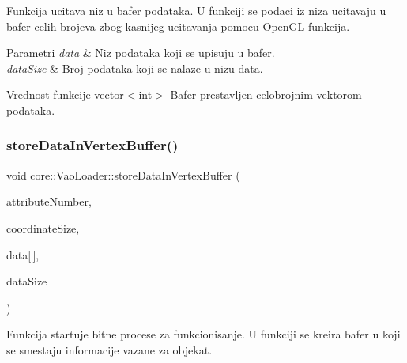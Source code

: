 Funkcija ucitava niz u bafer podataka. U funkciji se podaci iz niza ucitavaju u bafer celih brojeva zbog kasnijeg ucitavanja pomocu Open\+GL funkcija. 


\begin{DoxyParams}{Parametri}
{\em data} & Niz podataka koji se upisuju u bafer. \\
\hline
{\em data\+Size} & Broj podataka koji se nalaze u nizu data. \\
\hline
\end{DoxyParams}
\begin{DoxyReturn}{Vrednost funkcije}
vector$<$int$>$ Bafer prestavljen celobrojnim vektorom podataka. 
\end{DoxyReturn}
\mbox{\label{classcore_1_1VaoLoader_a234b87947a46ffcaea7dc6de09185a41}} 
\subsubsection{\texorpdfstring{store\+Data\+In\+Vertex\+Buffer()}{storeDataInVertexBuffer()}\hspace{0.1cm}{\footnotesize\ttfamily [1/2]}}
{\footnotesize\ttfamily void core\+::\+Vao\+Loader\+::store\+Data\+In\+Vertex\+Buffer (\begin{DoxyParamCaption}\item[{G\+Lint}]{attribute\+Number,  }\item[{int}]{coordinate\+Size,  }\item[{G\+Lfloat}]{data\mbox{[}$\,$\mbox{]},  }\item[{G\+Lint}]{data\+Size }\end{DoxyParamCaption})\hspace{0.3cm}{\ttfamily [private]}}



Funkcija startuje bitne procese za funkcionisanje. U funkciji se kreira bafer u koji se smestaju informacije vazane za objekat. 


